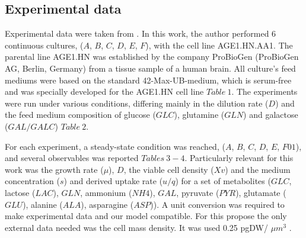 \subsection{Experimental data} 
	Experimental data were taken from . In this work, the author performed 6 continuous cultures, ($A$, $B$, $C$, $D$, $E$, $F$), with the cell line AGE1.HN.AA1. The parental line AGE1.HN was established by the company ProBioGen (ProBioGen AG, Berlin, Germany) from a tissue sample of a human brain. All culture's feed mediums were based on the standard 42-Max-UB-medium, which is serum-free and was specially developed for the AGE1.HN cell line $Table\ 1$. The experiments were run under various conditions, differing mainly in the dilution rate ($D$) and the feed medium composition of glucose ($GLC$), glutamine ($GLN$) and galactose ($GAL/GALC$) $Table\ 2$.
	
	For each experiment, a steady-state condition was reached, ($A$, $B$, $C$, $D$, $E$, $F01$), and several observables  was reported $Tables\ 3-4$. Particularly relevant for this work was the growth rate ($\mu$), $D$, the viable cell density ($Xv$) and the medium concentration ($s$) and derived uptake rate ($u/q$) for a set of metabolites ($GLC$, lactose ($LAC$), $GLN$, ammonium ($NH4$), $GAL$, pyruvate ($PYR$), glutamate ($GLU$), alanine ($ALA$), asparagine ($ASP$)). A unit conversion was required to make experimental data and our model compatible. For this propose the only external data needed was the cell mass density. It was used  0.25 pgDW/ $\mu$$m^3$ .